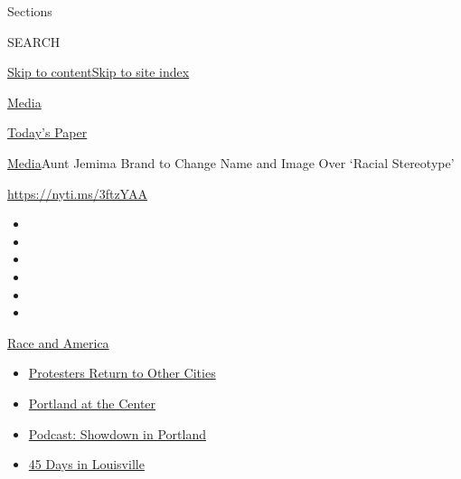 Sections

SEARCH

\protect\hyperlink{site-content}{Skip to
content}\protect\hyperlink{site-index}{Skip to site index}

\href{https://www.nytimes.com/section/business/media}{Media}

\href{https://myaccount.nytimes.com/auth/login?response_type=cookie\&client_id=vi}{}

\href{https://www.nytimes.com/section/todayspaper}{Today's Paper}

\href{/section/business/media}{Media}\textbar{}Aunt Jemima Brand to
Change Name and Image Over `Racial Stereotype'

\url{https://nyti.ms/3ftzYAA}

\begin{itemize}
\item
\item
\item
\item
\item
\item
\end{itemize}

\href{https://www.nytimes.com/news-event/george-floyd-protests-minneapolis-new-york-los-angeles?action=click\&pgtype=Article\&state=default\&region=TOP_BANNER\&context=storylines_menu}{Race
and America}

\begin{itemize}
\tightlist
\item
  \href{https://www.nytimes.com/2020/07/26/us/protests-portland-seattle-trump.html?action=click\&pgtype=Article\&state=default\&region=TOP_BANNER\&context=storylines_menu}{Protesters
  Return to Other Cities}
\item
  \href{https://www.nytimes.com/2020/07/24/us/portland-oregon-protests-white-race.html?action=click\&pgtype=Article\&state=default\&region=TOP_BANNER\&context=storylines_menu}{Portland
  at the Center}
\item
  \href{https://www.nytimes.com/2020/07/23/podcasts/the-daily/portland-protests.html?action=click\&pgtype=Article\&state=default\&region=TOP_BANNER\&context=storylines_menu}{Podcast:
  Showdown in Portland}
\item
  \href{https://www.nytimes.com/interactive/2020/07/16/us/black-lives-matter-protests-louisville-breonna-taylor.html?action=click\&pgtype=Article\&state=default\&region=TOP_BANNER\&context=storylines_menu}{45
  Days in Louisville}
\end{itemize}


